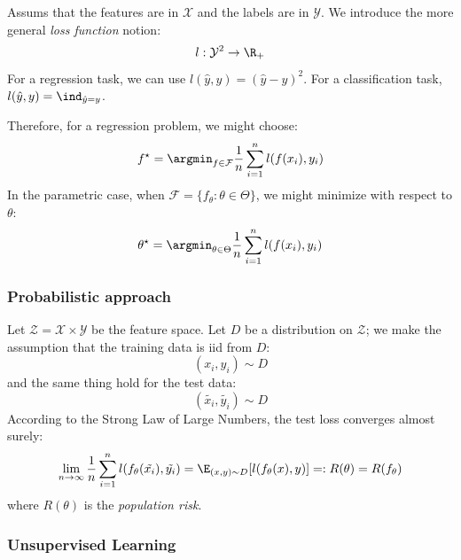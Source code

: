 \documentclass[toc]{../cs-classes/cs-classes}
\begin{document}
\begin{definition}
    Assums that the features are in $\mathcal{X}$ and the labels are in $\mathcal{Y}$. We introduce the more general \emph{loss function} notion:
    \begin{equation*}
        l:\mathcal{Y}^2\to \R_+
    \end{equation*}
    For a regression task, we can use $l(\hat{y}, y)=(\hat{y}-y)^2$. For a classification task, $l(\hat{y}, y)=\ind_{\hat{y}=y}$.
\end{definition}

Therefore, for a regression problem, we might choose:
\begin{equation*}
    f^\star=\argmin_{f\in\mathcal{F}}\frac{1}{n}\sum_{i=1}^n l(f(x_i), y_i)
\end{equation*}
In the parametric case, when $\mathcal{F}=\{f_\theta : \theta\in\Theta\}$, we might minimize with respect to $\theta$:
\begin{equation*}
    \theta^\star=\argmin_{\theta\in\Theta}\frac{1}{n}\sum_{i=1}^n l(f(x_i), y_i)
\end{equation*}

\subsubsection{Probabilistic approach}
Let $\mathcal{Z}=\mathcal{X}\times\mathcal{Y}$ be the feature space. Let $D$ be a distribution on $\mathcal{Z}$; we make the assumption that the training data is iid from $D$:
\begin{equation*}
    (x_i, y_i)\sim D
\end{equation*}
and the same thing hold for the test data:
\begin{equation*}
    (\tilde{x_i}, \tilde{y_i})\sim D
\end{equation*}
According to the Strong Law of Large Numbers, the test loss converges almost surely:
\begin{equation*}
    \lim_{n\to\infty}\frac{1}{n}\sum_{i=1}^n l(f_\theta(\tilde{x_i}), \tilde{y_i}) = \E_{(x, y)\sim D}[l(f_\theta(x), y)] =: R(\theta)=R(f_\theta)
\end{equation*}
where $R(\theta)$ is the \emph{population risk}.

\begin{definition}
    
\end{definition}

\subsubsection{Unsupervised Learning}
\begin{example}[Clustering]
    
\end{example}
\end{document}
